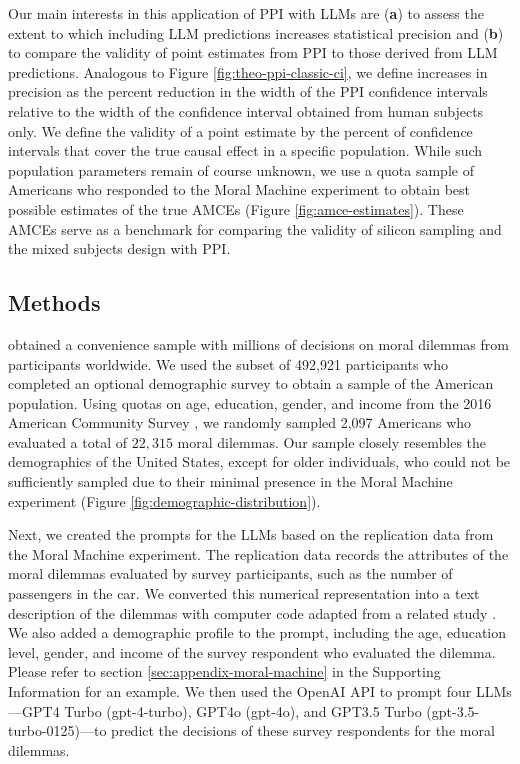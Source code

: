 \documentclass{article}
\begin{document}
Our main interests in this application of PPI with LLMs are (\textbf{a}) to assess the extent to which including LLM predictions increases statistical precision and (\textbf{b}) to compare the validity of point estimates from PPI to those derived from LLM predictions. Analogous to Figure \ref{fig:theo-ppi-classic-ci}, we define increases in precision as the percent reduction in the width of the PPI confidence intervals relative to the width of the confidence interval obtained from human subjects only. We define the validity of a point estimate by the percent of confidence intervals that cover the true causal effect in a specific population. While such population parameters remain of course unknown, we use a quota sample of Americans who responded to the Moral Machine experiment to obtain best possible estimates of the true AMCEs (Figure \ref{fig:amce-estimates}). These AMCEs serve as a benchmark for comparing the validity of silicon sampling and the mixed subjects design with PPI. 

\subsection{Methods}

\citet{awad_moral_2018} obtained a convenience sample with millions of decisions on moral dilemmas from participants worldwide. We used the subset of 492,921 participants who completed an optional demographic survey to obtain a sample of the American population. Using quotas on age, education, gender, and income from the 2016 American Community Survey \citep{acs_2016}, we randomly sampled 2,097 Americans who evaluated a total of $22,315$ moral dilemmas.
Our sample closely resembles the demographics of the United States, except for older individuals, who could not be sufficiently sampled due to their minimal presence in the Moral Machine experiment (Figure \ref{fig:demographic-distribution}).

Next, we created the prompts for the LLMs based on the replication data from the Moral Machine experiment. The replication data records the attributes of the moral dilemmas evaluated by survey participants, such as the number of passengers in the car. We converted this numerical representation into a text description of the dilemmas with computer code adapted from a related study \citep{takemoto_moral_2024}. We also added a demographic profile to the prompt, including the age, education level, gender, and income of the survey respondent who evaluated the dilemma. Please refer to section \ref{sec:appendix-moral-machine} in the Supporting Information for an example. We then used the OpenAI API to prompt four LLMs---GPT4 Turbo (gpt-4-turbo), GPT4o (gpt-4o), and GPT3.5 Turbo (gpt-3.5-turbo-0125)---to predict the decisions of these survey respondents for the moral dilemmas.
\end{document}
